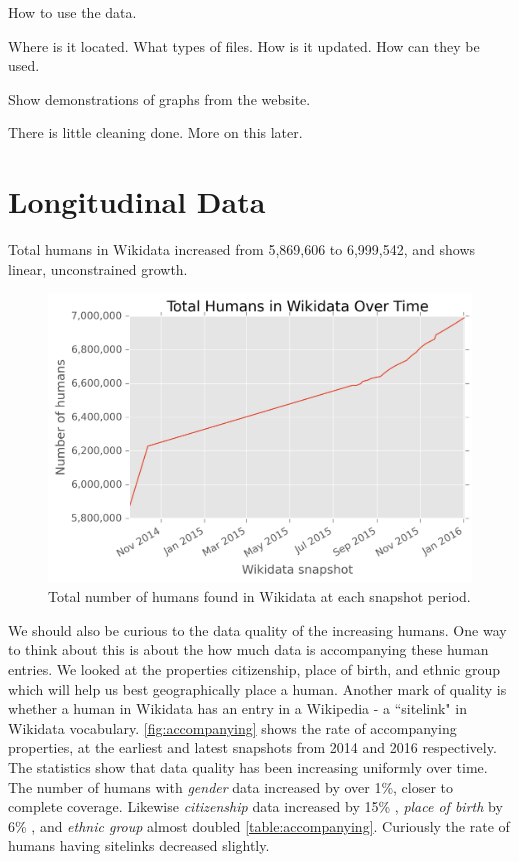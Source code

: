 \documentclass{sigchi-ext}
\begin{document}
How to use the data.

Where is it located.
What types of files.
How is it updated.
How can they be used. 

Show demonstrations of graphs from the website.

There is little cleaning done. More on this later.

\section{Longitudinal Data}
Total humans in Wikidata increased from 5,869,606 to 6,999,542, and shows linear, unconstrained growth.
\begin{figure}
\label{fig:totalhumans}
\includegraphics[scale=0.6]{figures/totalhumans.png} 
\caption{Total number of humans found in Wikidata at each snapshot period.}
\end{figure}

We should also be curious to the data quality of the increasing humans. One way to think about this is about the how much data is accompanying these human entries. We looked at the properties citizenship, place of birth, and ethnic group which will help us best geographically place a human. Another mark of quality is whether a human in Wikidata has an entry in a Wikipedia - a ``sitelink" in Wikidata vocabulary. \ref{fig:accompanying} shows the rate of accompanying properties, at the earliest and latest snapshots from 2014 and 2016 respectively. The statistics show that data quality has been increasing uniformly over time. The number of humans with \textit{gender} data increased by over 1\%, closer to complete coverage. Likewise \textit{citizenship} data increased by 15\% , \textit{place of birth} by 6\%  , and \textit{ethnic group} almost doubled \ref{table:accompanying}. Curiously the rate of humans having sitelinks decreased slightly. 
\end{document}

